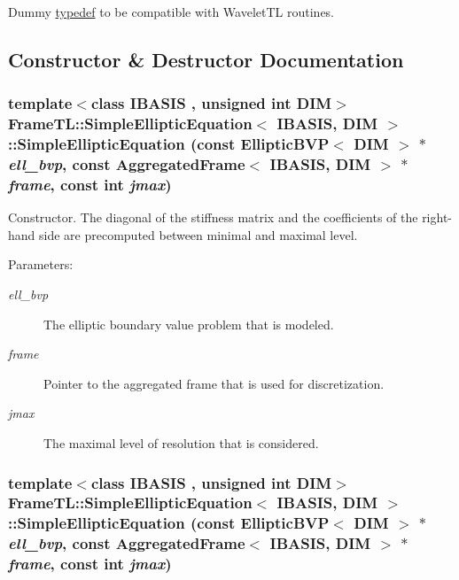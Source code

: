 Dummy \hyperlink{structtypedef}{typedef} to be compatible with WaveletTL routines. 

\subsection{Constructor \& Destructor Documentation}
\hypertarget{classFrameTL_1_1SimpleEllipticEquation_d043ab2f1d2d62e13a2241ec148a10a2}{
\subsubsection[{SimpleEllipticEquation}]{\setlength{\rightskip}{0pt plus 5cm}template$<$class IBASIS , unsigned int DIM$>$ {\bf FrameTL::SimpleEllipticEquation}$<$ IBASIS, DIM $>$::{\bf SimpleEllipticEquation} (const EllipticBVP$<$ DIM $>$ $\ast$ {\em ell\_\-bvp}, \/  const {\bf AggregatedFrame}$<$ IBASIS, DIM $>$ $\ast$ {\em frame}, \/  const int {\em jmax})}}
\label{classFrameTL_1_1SimpleEllipticEquation_d043ab2f1d2d62e13a2241ec148a10a2}


Constructor. The diagonal of the stiffness matrix and the coefficients of the right-hand side are precomputed between minimal and maximal level.

\begin{Desc}
\item[Parameters:]
\begin{description}
\item[{\em ell\_\-bvp}]The elliptic boundary value problem that is modeled. \item[{\em frame}]Pointer to the aggregated frame that is used for discretization. \item[{\em jmax}]The maximal level of resolution that is considered. \end{description}
\end{Desc}
\hypertarget{classFrameTL_1_1SimpleEllipticEquation_d043ab2f1d2d62e13a2241ec148a10a2}{
\subsubsection[{SimpleEllipticEquation}]{\setlength{\rightskip}{0pt plus 5cm}template$<$class IBASIS , unsigned int DIM$>$ {\bf FrameTL::SimpleEllipticEquation}$<$ IBASIS, DIM $>$::{\bf SimpleEllipticEquation} (const EllipticBVP$<$ DIM $>$ $\ast$ {\em ell\_\-bvp}, \/  const {\bf AggregatedFrame}$<$ IBASIS, DIM $>$ $\ast$ {\em frame}, \/  const int {\em jmax})}}
\label{classFrameTL_1_1SimpleEllipticEquation_d043ab2f1d2d62e13a2241ec148a10a2}


